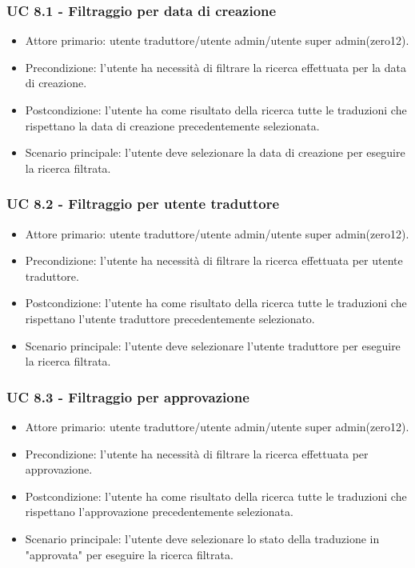     \subsubsection{UC 8.1 - Filtraggio per data di creazione}
        \begin{itemize}
            \item Attore primario: utente traduttore/utente admin/utente super admin(zero12).
            \item Precondizione: l'utente ha necessità di filtrare la ricerca effettuata per la data di creazione.
            \item Postcondizione: l'utente ha come risultato della ricerca tutte le traduzioni che rispettano la data di creazione precedentemente selezionata. 
            \item Scenario principale: l'utente deve selezionare la data di creazione per eseguire la ricerca filtrata.
        \end{itemize}
    \subsubsection{UC 8.2 - Filtraggio per utente traduttore}
        \begin{itemize}
            \item Attore primario: utente traduttore/utente admin/utente super admin(zero12).
            \item Precondizione: l'utente ha necessità di filtrare la ricerca effettuata per utente traduttore.
            \item Postcondizione: l'utente ha come risultato della ricerca tutte le traduzioni che rispettano l'utente traduttore precedentemente selezionato. 
            \item Scenario principale: l'utente deve selezionare l'utente traduttore per eseguire la ricerca filtrata.
        \end{itemize}
    \subsubsection{UC 8.3 - Filtraggio per approvazione}
        \begin{itemize}
            \item Attore primario: utente traduttore/utente admin/utente super admin(zero12).
            \item Precondizione: l'utente ha necessità di filtrare la ricerca effettuata per approvazione.
            \item Postcondizione: l'utente ha come risultato della ricerca tutte le traduzioni che rispettano l'approvazione precedentemente selezionata. 
            \item Scenario principale: l'utente deve selezionare lo stato della traduzione in "approvata" per eseguire la ricerca filtrata.
        \end{itemize}
